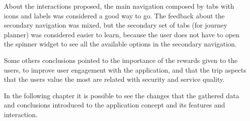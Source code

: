 About the interactions proposed, the main navigation composed by tabs with icons and labels was considered a good way to go. The feedback about the secondary navigation was mixed, but the secondary set of tabs (for journey planner) was considered easier to learn, because the user does not have to open the spinner widget to see all the available options in the secondary navigation.

Some others conclusions pointed to the importance of the rewards given to the users, to improve user engagement with the application, and that the trip aspects that the users value the most are related with security and service quality.


In the following chapter it is possible to see the changes that the gathered data and conclusions introduced to the application concept and its features and interaction.
